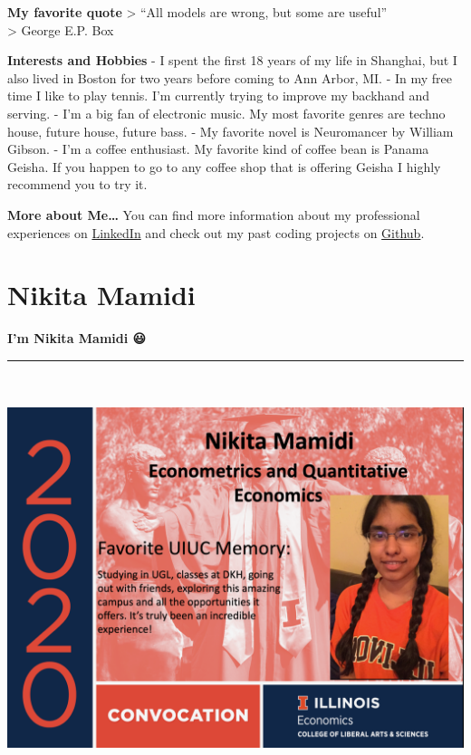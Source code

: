 \documentclass[
]{book}
\begin{document}
\textbf{My favorite quote}
\textgreater{} ``All models are wrong, but some are useful''\\
\textgreater{} George E.P. Box

\textbf{Interests and Hobbies}
- I spent the first 18 years of my life in Shanghai, but I also lived in Boston for two years before coming to Ann Arbor, MI.
- In my free time I like to play tennis. I'm currently trying to improve my backhand and serving.
- I'm a big fan of electronic music. My most favorite genres are techno house, future house, future bass.
- My favorite novel is Neuromancer by William Gibson.
- I'm a coffee enthusiast. My favorite kind of coffee bean is Panama Geisha. If you happen to go to any coffee shop that is offering Geisha I highly recommend you to try it.

\textbf{More about Me\ldots{}}
You can find more information about my professional experiences on \href{https://www.linkedin.com/in/ycg2022/}{LinkedIn} and check out my past coding projects on \href{https://github.com/Yuchen-G}{Github}.

\hypertarget{nikita-mamidi}{%
\section{Nikita Mamidi}\label{nikita-mamidi}}

\textbf{I'm Nikita Mamidi 😃}

\begin{center}\rule{0.5\linewidth}{0.5pt}\end{center}

\includegraphics[width=9.375in,height=4.6875in]{nikita1.png}
\end{document}
